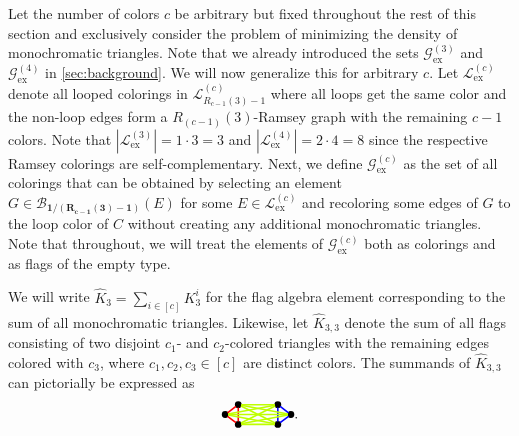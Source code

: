 \documentclass[a4paper,11pt]{article}
\numberwithin{equation}{section}
\newcommand{\mB}{\mathcal{B}}
\newcommand{\mG}{\mathcal{G}}
\newcommand{\mL}{\mathcal{L}}
\begin{document}
Let the number of colors $c$ be arbitrary but fixed throughout the rest of this section and exclusively consider the problem of minimizing the density of monochromatic triangles. %
Note that we already introduced the sets $\mG_{\operatorname{ex}}^{(3)}$ and $\mG_{\operatorname{ex}}^{(4)}$ in \cref{sec:background}. We will now generalize this for arbitrary $c$. Let $\mL_{\operatorname{ex}}^{(c)}$ denote all looped colorings in $\mL^{(c)}_{R_{c-1}(3)-1}$ where all loops get the same color and the non-loop edges form a $R_{(c-1)}(3)$-Ramsey graph with the remaining $c-1$ colors. Note that $|\mL_{\operatorname{ex}}^{(3)}| = 1 \cdot 3 = 3$ and $|\mL_{\operatorname{ex}}^{(4)}| = 2 \cdot 4 = 8$ since the respective Ramsey colorings are self-complementary. Next, we define $\mG^{(c)}_{\operatorname{ex}}$ as the set of all colorings
that can be obtained by selecting an element $G\in\mB_\mathbf{1/(R_{c-1}(3)-1)} (E)$ for some $E \in\mL_{\operatorname{ex}}^{(c)}$ and recoloring some edges of $G$ to the loop color of $C$ without creating any additional monochromatic triangles. Note that throughout, we will treat the elements of $\mG^{(c)}_{\operatorname{ex}}$ both as colorings and as flags of the empty type.

%
We will write $\hat K_3 = \sum_{i \in [c]} K_3^i$ for
the flag algebra element corresponding to the sum of all monochromatic triangles. Likewise, let $\hat K_{3,3}$ denote the sum of all flags consisting of two disjoint $c_1$- and $c_2$-colored triangles with the remaining edges colored with $c_3$, where $c_1,c_2,c_3\in [c]$ are distinct colors. The summands of $\hat K_{3,3}$ can pictorially be expressed as 
\[   
   \begin{tikzpicture}[line width=0.4mm, baseline=1ex,
        scale = 0.5]
        \node[circle,fill=black,draw,scale=0.4] (A) at (0,0) {};
        \node[circle,fill=black,draw, scale=0.4] (B) at (0,1) {};
        \node[circle,fill=black,draw, scale=0.4] (C) at (-0.66,0.5) {};
        \draw[red] (A) -- (B);
        \draw[red] (A) -- (C);
        \draw[red] (B) -- (C);
        \node[circle,fill=black,draw,scale=0.4] (E) at (2,0) {};
        \node[circle,fill=black,draw, scale=0.4] (F) at (2,1) {};
        \node[circle,fill=black,draw, scale=0.4] (G) at (2.66,0.5) {};
        \draw[blue] (E) -- (F);
        \draw[blue] (E) -- (G);
        \draw[blue] (F) -- (G);

        \draw[lime] (A) -- (E);
        \draw[lime] (B) -- (E);
        \draw[lime] (C) -- (E);
        \draw[lime] (A) -- (F);
        \draw[lime] (B) -- (F);
        \draw[lime] (C) -- (F);
        \draw[lime] (A) -- (G);
        \draw[lime] (B) -- (G);
        \draw[lime] (C) -- (G);
        
    \end{tikzpicture}.
\]
\end{document}

